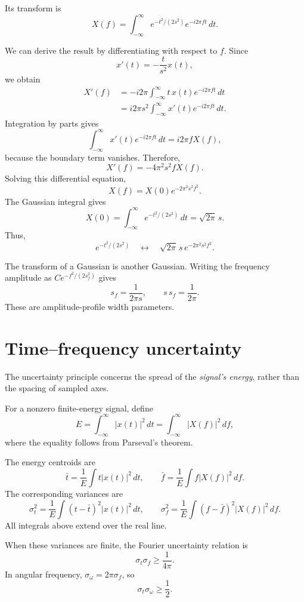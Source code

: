 \documentclass[11pt,letterpaper]{article}
\begin{document}
Its transform is
\[
X(f)=\int_{-\infty}^{\infty}
e^{-t^2/(2s^2)}e^{-i2\pi ft}\,dt.
\]

We can derive the result by differentiating with respect to $f$.
Since
\[
x'(t)=-\frac{t}{s^2}x(t),
\]
we obtain
\begin{align}
X'(f)
&=-i2\pi\int_{-\infty}^{\infty}
t\,x(t)e^{-i2\pi ft}\,dt\\
&=i2\pi s^2\int_{-\infty}^{\infty}
x'(t)e^{-i2\pi ft}\,dt.
\end{align}
Integration by parts gives
\[
\int_{-\infty}^{\infty}x'(t)e^{-i2\pi ft}\,dt
=i2\pi fX(f),
\]
because the boundary term vanishes. Therefore,
\[
X'(f)=-4\pi^2s^2fX(f).
\]
Solving this differential equation,
\[
X(f)=X(0)e^{-2\pi^2s^2f^2}.
\]
The Gaussian integral gives
\[
X(0)=\int_{-\infty}^{\infty}e^{-t^2/(2s^2)}\,dt
=\sqrt{2\pi}\,s.
\]
Thus,
\begin{equation}
\boxed{
e^{-t^2/(2s^2)}
\quad\longleftrightarrow\quad
\sqrt{2\pi}\,s\,e^{-2\pi^2s^2f^2}.
}
\end{equation}

The transform of a Gaussian is another Gaussian. Writing the
frequency amplitude as $C e^{-f^2/(2s_f^2)}$ gives
\[
s_f=\frac{1}{2\pi s},
\qquad
\boxed{s\,s_f=\frac{1}{2\pi}.}
\]
These are amplitude-profile width parameters.

\section{Time--frequency uncertainty}

The uncertainty principle concerns the spread of the
\emph{signal's energy}, rather than the spacing of sampled axes.

For a nonzero finite-energy signal, define
\[
E=\int_{-\infty}^{\infty}|x(t)|^2\,dt
=\int_{-\infty}^{\infty}|X(f)|^2\,df,
\]
where the equality follows from Parseval's theorem.

The energy centroids are
\[
\bar t=\frac{1}{E}\int t|x(t)|^2\,dt,
\qquad
\bar f=\frac{1}{E}\int f|X(f)|^2\,df.
\]
The corresponding variances are
\begin{equation}
\sigma_t^2=\frac{1}{E}\int(t-\bar t)^2|x(t)|^2\,dt,
\qquad
\sigma_f^2=\frac{1}{E}\int(f-\bar f)^2|X(f)|^2\,df.
\end{equation}
All integrals above extend over the real line.

When these variances are finite, the Fourier uncertainty relation is
\begin{equation}
\boxed{\sigma_t\sigma_f\geq\frac{1}{4\pi}.}
\end{equation}
In angular frequency, $\sigma_\omega=2\pi\sigma_f$, so
\[
\boxed{\sigma_t\sigma_\omega\geq\frac12.}
\]
\end{document}
